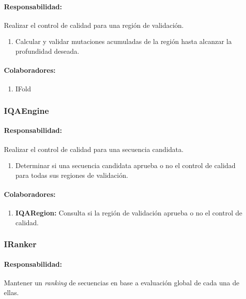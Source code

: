     \paragraph{Responsabilidad:} Realizar el control de calidad para una
regi\'on de validaci\'on.
      \begin{enumerate}
       \item Calcular y validar mutaciones acumuladas de la regi\'on hasta
alcanzar la profundidad deseada.
      \end{enumerate}
    \paragraph{Colaboradores:}
      \begin{enumerate}
       \item IFold
      \end{enumerate}

  \subsubsection{IQAEngine}
    \paragraph{Responsabilidad:} Realizar el control de calidad para una
secuencia candidata.
      \begin{enumerate}             
       \item Determinar si una secuencia candidata aprueba o no el control de
calidad para todas sus regiones de validaci\'on.
      \end{enumerate}
    \paragraph{Colaboradores:}
      \begin{enumerate}
       \item \textbf{IQARegion:} Consulta si la regi\'on de validaci\'on aprueba
o no el control de calidad.
      \end{enumerate}

  \subsubsection{IRanker}
    \paragraph{Responsabilidad:} Mantener un \textit{ranking} de secuencias en
base a evaluaci\'on global de cada una de ellas.    

